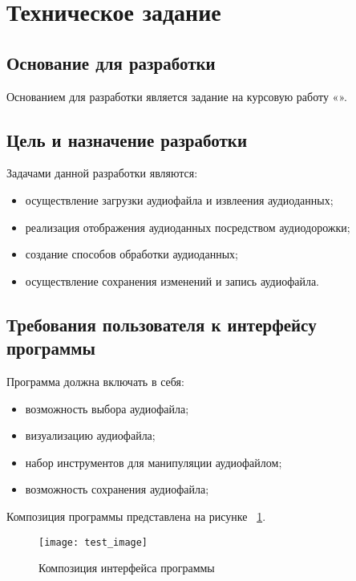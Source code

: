 \section{Техническое задание}
\subsection{Основание для разработки}

Основанием для разработки является задание на курсовую работу «».

\subsection{Цель и назначение разработки}

Задачами данной разработки являются:
\begin{itemize}
\item осуществление загрузки аудиофайла и извлеения аудиоданных;
\item реализация отображения аудиоданных посредством аудиодорожки;
\item создание способов обработки аудиоданных;
\item осуществление сохранения изменений и запись аудиофайла.
\end{itemize}

\subsection{Требования пользователя к интерфейсу программы}

Программа должна включать в себя:
\begin{itemize}
    \item возможность выбора аудиофайла;
    \item визуализацию аудиофайла;
    \item набор инструментов для манипуляции аудиофайлом;
    \item возможность сохранения аудиофайла;
\end{itemize}

Композиция программы представлена на рисунке ~\ref{test_image:image}.

\begin{figure}[ht]
\texttt{[image: test\_image]}
\caption{Композиция интерфейса программы}
\label{test_image:image}
\end{figure}

